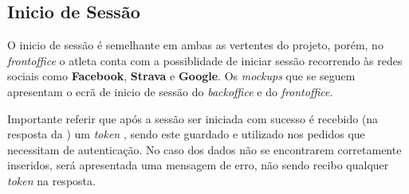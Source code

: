\subsection{Inicio de Sessão}
\label{loginSequenceDiagram}


O inicio de sessão é semelhante em ambas as vertentes do projeto, porém, no \textit{frontoffice} o atleta conta com a possiblidade de iniciar sessão recorrendo às redes sociais como \textbf{Facebook}, \textbf{Strava} e \textbf{Google}. Os \textit{mockups} que se seguem apresentam o ecrã de inicio de sessão do \textit{backoffice} e do \textit{frontoffice}.




Importante referir que após a sessão ser iniciada com sucesso é recebido (na resposta da ) um \textit{token} \textbf{}, sendo este guardado e utilizado nos pedidos que necessitam de autenticação. No caso dos dados não se encontrarem corretamente inseridos, será apresentada uma mensagem de erro, não sendo recibo qualquer \textit{token} na resposta.